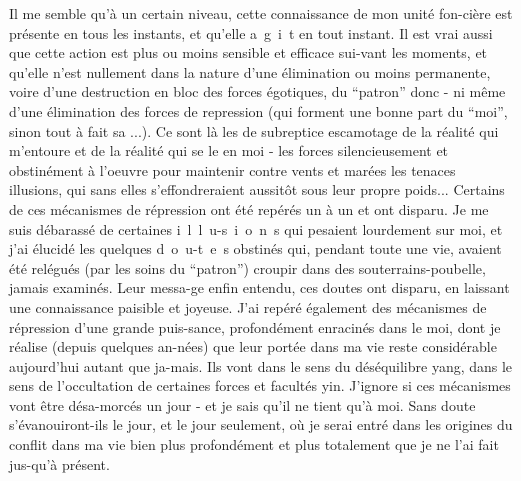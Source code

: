 Il me semble qu'à un certain niveau, cette connaissance de mon unité fon-\linebreak cière est présente en tous les instants, et qu'elle \mbox{a g i t} en tout instant. Il est vrai aussi que cette action est plus ou moins sensible et efficace sui-\linebreak vant les moments, et qu'elle n'est nullement dans la nature d'une élimination  ou moins permanente, voire d'une destruction en bloc des forces égotiques, du ``patron'' donc - ni même d'une élimination des forces de repression (qui forment une bonne part du ``moi'', sinon tout à fait sa ...). Ce sont là les  de subreptice escamotage de la réalité qui m'entoure et de la réalité qui se \linebreak le en moi - les forces silencieusement et obstinément à l'oeuvre pour maintenir contre vents et marées les tenaces illusions, qui sans elles s'effondreraient aussitôt sous leur propre poids... Certains de ces mécanismes de répression ont été repérés un à un et ont disparu. Je me suis débarassé de certaines \mbox{i l l u-}\linebreak\mbox{s i o n s} qui pesaient lourdement sur moi, et j'ai élucidé les quelques \mbox{d o u-}\linebreak\mbox{t e s} obstinés qui, pendant toute une vie, avaient été relégués (par les soins du ``patron'') croupir dans des souterrains-poubelle, jamais examinés. Leur messa-\linebreak ge enfin entendu, ces doutes ont disparu, en laissant une connaissance paisible et joyeuse. J'ai repéré également des mécanismes de répression d'une grande puis-\linebreak sance, profondément enracinés dans le moi, dont je réalise (depuis quelques an-\linebreak nées) que leur portée dans ma vie reste considérable aujourd'hui autant que ja-\linebreak mais. Ils vont dans le sens du déséquilibre yang, dans le sens de l'occultation de certaines forces et facultés yin. J'ignore si ces mécanismes vont être désa-\linebreak morcés un jour - et je sais qu'il ne tient qu'à moi. Sans doute s'évanouiront-ils le jour, et le jour seulement, où je serai entré dans les origines du conflit \inserted{\unsure{:}} dans ma vie bien plus profondément et plus totalement que je ne l'ai fait jus-\linebreak qu'à présent.

